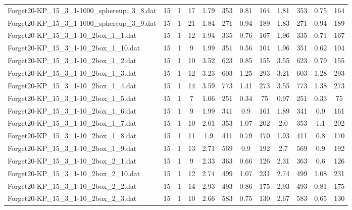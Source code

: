 \begin{sidewaystable}[!ht]
{\begin{tabular}{lccccccccccc}
Forget20-KP\_15\_3\_1-1000\_sphereup\_3\_8.dat & 15 & 1 & 17 & 1.79 & 353 & 0.81 & 164 & 1.81 & 353 &  \textcolor{blue2}{0.75} & 164 \\
Forget20-KP\_15\_3\_1-1000\_sphereup\_3\_9.dat & 15 & 1 & 21 & 1.84 & 271 &  \textcolor{blue2}{0.94} & 189 & 1.83 & 271 &  \textcolor{blue2}{0.94} & 189 \\
Forget20-KP\_15\_3\_1-10\_2box\_1\_1.dat & 15 & 1 & 12 & 1.94 & 335 & 0.76 & 167 & 1.96 & 335 &  \textcolor{blue2}{0.71} & 167 \\
Forget20-KP\_15\_3\_1-10\_2box\_1\_10.dat & 15 & 1 & 9 & 1.99 & 351 &  \textcolor{blue2}{0.56} & 104 & 1.96 & 351 & 0.62 & 104 \\
Forget20-KP\_15\_3\_1-10\_2box\_1\_2.dat & 15 & 1 & 10 & 3.52 & 623 & 0.85 & 155 & 3.55 & 623 &  \textcolor{blue2}{0.79} & 155 \\
Forget20-KP\_15\_3\_1-10\_2box\_1\_3.dat & 15 & 1 & 12 & 3.23 & 603 &  \textcolor{blue2}{1.25} & 293 & 3.21 & 603 & 1.28 & 293 \\
Forget20-KP\_15\_3\_1-10\_2box\_1\_4.dat & 15 & 1 & 14 & 3.59 & 773 & 1.41 & 273 & 3.55 & 773 & 1.38 & 273 \\
Forget20-KP\_15\_3\_1-10\_2box\_1\_5.dat & 15 & 1 & 7 & 1.06 & 251 & 0.34 & 75 & 0.97 & 251 &  \textcolor{blue2}{0.33} & 75 \\
Forget20-KP\_15\_3\_1-10\_2box\_1\_6.dat & 15 & 1 & 9 & 1.99 & 341 &  \textcolor{blue2}{0.9} & 161 & 1.89 & 341 &  \textcolor{blue2}{0.9} & 161 \\
Forget20-KP\_15\_3\_1-10\_2box\_1\_7.dat & 15 & 1 & 10 & 2.01 & 353 &  \textcolor{blue2}{1.07} & 202 & 2.0 & 353 & 1.1 & 202 \\
Forget20-KP\_15\_3\_1-10\_2box\_1\_8.dat & 15 & 1 & 11 & 1.9 & 411 &  \textcolor{blue2}{0.79} & 170 & 1.93 & 411 & 0.8 & 170 \\
Forget20-KP\_15\_3\_1-10\_2box\_1\_9.dat & 15 & 1 & 13 & 2.71 & 569 &  \textcolor{blue2}{0.9} & 192 & 2.7 & 569 &  \textcolor{blue2}{0.9} & 192 \\
Forget20-KP\_15\_3\_1-10\_2box\_2\_1.dat & 15 & 1 & 9 & 2.33 & 363 & 0.66 & 126 & 2.31 & 363 &  \textcolor{blue2}{0.6} & 126 \\
Forget20-KP\_15\_3\_1-10\_2box\_2\_10.dat & 15 & 1 & 12 & 2.74 & 499 & 1.07 & 231 & 2.74 & 499 & 1.08 & 231 \\
Forget20-KP\_15\_3\_1-10\_2box\_2\_2.dat & 15 & 1 & 14 & 2.93 & 493 & 0.86 & 175 & 2.93 & 493 & 0.81 & 175 \\
Forget20-KP\_15\_3\_1-10\_2box\_2\_3.dat & 15 & 1 & 10 & 2.66 & 583 & 0.75 & 130 & 2.67 & 583 &  \textcolor{blue2}{0.65} & 130 \\

\end{tabular}}
\end{sidewaystable}
